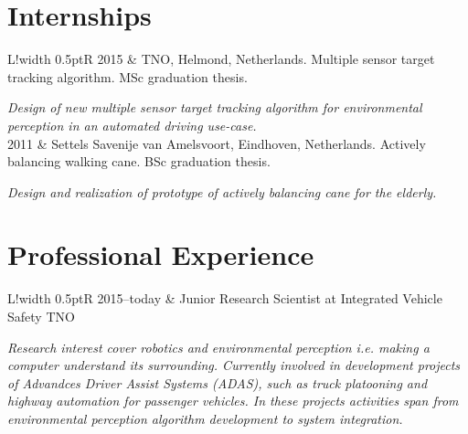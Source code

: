 \documentclass[a4paper,10pt]{article}
\newcommand\VRule{\color{lightgray}\vrule width 0.5pt}
\begin{document}
\section*{Internships}
\begin{tabular}{L!{\VRule}R}
2015 & TNO, Helmond, Netherlands. Multiple sensor target tracking algorithm. MSc graduation thesis. \par\textit{Design of new multiple sensor target tracking algorithm for environmental perception in an automated driving use-case.}\\
2011 & Settels Savenije van Amelsvoort, Eindhoven, Netherlands. Actively balancing walking cane. BSc graduation thesis. \par\textit{Design and realization of prototype of actively balancing cane for the elderly.}\\
\end{tabular}

\section*{Professional Experience}
\begin{tabular}{L!{\VRule}R}
2015--today & Junior Research Scientist at Integrated Vehicle Safety TNO \par\textit{Research interest cover robotics and environmental perception i.e. making a computer understand its surrounding. Currently involved in development projects of Advandces Driver Assist Systems (ADAS), such as truck platooning and highway automation for passenger vehicles. In these projects activities span from environmental perception algorithm development to system integration.}\\
\end{tabular}
\end{document}
